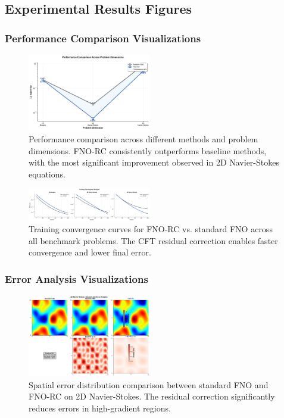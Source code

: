 \documentclass[11pt,twocolumn]{article}
\begin{document}
\subsection{Experimental Results Figures}
\label{app:figures}

\subsubsection{Performance Comparison Visualizations}

\begin{figure}[h]
\centering
\includegraphics[width=0.48\textwidth]{figures/performance_comparison.png}
\caption{Performance comparison across different methods and problem dimensions. FNO-RC consistently outperforms baseline methods, with the most significant improvement observed in 2D Navier-Stokes equations.}
\label{fig:app_performance}
\end{figure}

\begin{figure}[h]
\centering
\includegraphics[width=0.48\textwidth]{figures/training_curves.png}
\caption{Training convergence curves for FNO-RC vs. standard FNO across all benchmark problems. The CFT residual correction enables faster convergence and lower final error.}
\label{fig:app_training}
\end{figure}

\subsubsection{Error Analysis Visualizations}

\begin{figure}[h]
\centering
\includegraphics[width=0.48\textwidth]{figures/error_analysis.png}
\caption{Spatial error distribution comparison between standard FNO and FNO-RC on 2D Navier-Stokes. The residual correction significantly reduces errors in high-gradient regions.}
\label{fig:app_error}
\end{figure}
\end{document}
